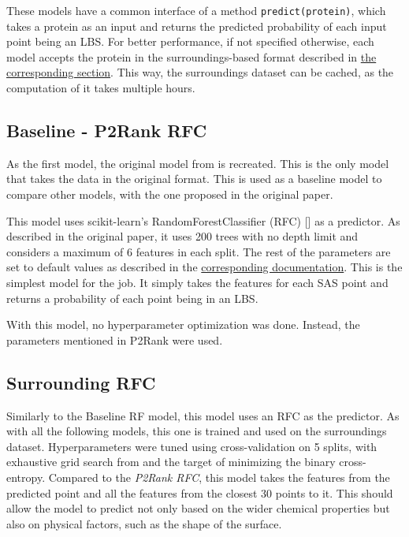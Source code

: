 These models have a common interface of a method \texttt{predict(protein)}, which takes a protein as an input and returns the predicted probability of each input point being an LBS. For better performance, if not specified otherwise, each model accepts the protein in the surroundings-based format described in \hyperref[Surroundings]{the corresponding section}. This way, the surroundings dataset can be cached, as the computation of it takes multiple hours.

\subsection{Baseline - P2Rank RFC}
As the first model, the original model from \cite{P2RANK} is recreated. This is the only model that takes the data in the original format. This is used as a baseline model to compare other models, with the one proposed in the original paper.

This model uses scikit-learn's RandomForestClassifier (RFC) [\cite{scikit-learn}] as a predictor. As described in the original paper, it uses 200 trees with no depth limit and considers a maximum of 6 features in each split. The rest of the parameters are set to default values as described in the \hyperlink{https://scikit-learn.org/1.1/modules/generated/sklearn.ensemble.RandomForestClassifier.html}{corresponding documentation}. This is the simplest model for the job. It simply takes the features for each SAS point and returns a probability of each point being in an LBS.

With this model, no hyperparameter optimization was done. Instead, the parameters mentioned in P2Rank were used.

\subsection{Surrounding RFC}

Similarly to the Baseline RF model, this model uses an RFC as the predictor. As with all the following models, this one is trained and used on the surroundings dataset. Hyperparameters were tuned using cross-validation on 5 splits, with exhaustive grid search from \cite{scikit-learn} and the target of minimizing the binary cross-entropy. Compared to the \textit{P2Rank RFC}, this model takes the features from the predicted point and all the features from the closest 30 points to it. This should allow the model to predict not only based on the wider chemical properties but also on physical factors, such as the shape of the surface. 

